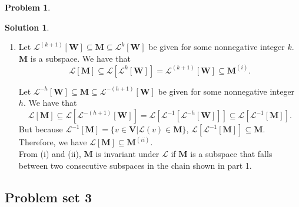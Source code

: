 \documentclass{article}
\theoremstyle{definition}
\newtheorem*{prob*}{Problem}
\newtheorem*{sln*}{Solution}
\newcommand{\V}{\mathbf{V}}
\newcommand{\W}{\mathbf{W}}
\newcommand{\lag}{\mathcal{L}}
\begin{document}
\begin{prob*}
\begin{sln*}
\begin{enumerate}
				
				
				
				
			\item	
			Let $\lag^{(k+1)}[\W] \subseteq \mathbf{M} \subseteq \lag^{k}[\W]$ be given for some nonnegative integer $k$. $\mathbf{M}$ is a subspace. We have that
			$$\lag[\mathbf{M}] \subseteq \lag[\lag^{k}[\W]] = \lag^{(k+1)}[\W] \subseteq \mathbf{M}^{(i)}. $$
			
			Let $\lag^{-h}[\mathbf{W}] \subseteq \mathbf{M} \subseteq \lag^{-(h+1)}[\W]$ be given for some nonnegative integer $h$. We have that
			$$ \lag[\mathbf{M}] \subseteq \lag[\lag^{-(h+1)}[\W]] = \lag[\lag^{-1}[\lag^{-h}[\W]]] \subseteq \lag[\lag^{-1}[\mathbf{M}]].  $$
			But because $\lag^{-1}[\mathbf{M}] = \{ v\in \V \vert \lag(v)\in \mathbf{M} \}$, $\lag[\lag^{-1}[\mathbf{M}]] \subseteq \mathbf{M}$. Therefore, we have $\lag[\mathbf{M}] \subseteq \mathbf{M}^{(ii)}$.\\ 
			
			From (i) and (ii), $\mathbf{M}$ is invariant under $\lag$ if $\mathbf{M}$ is a subspace that falls between two consecutive subspaces in the chain shown in part 1.
			
		\end{enumerate}
	\end{sln*}
\end{prob*}






































\newpage
\subsection{Problem set 3}
\end{document}
